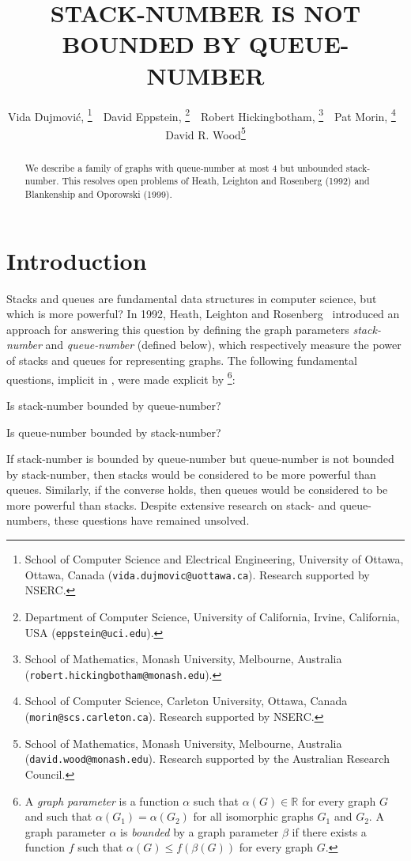\documentclass[kpfonts]{patmorin}
\title{\MakeUppercase{Stack-Number is not Bounded by Queue-Number}}
\author{%
	Vida Dujmovi\'c,\!\!%
	\thanks{School of Computer Science and Electrical Engineering,
		University of Ottawa, Ottawa, Canada (\texttt{vida.dujmovic@uottawa.ca}).
		Research supported by NSERC.}
	\,\,
	David Eppstein,\!\!%
	\thanks{Department of Computer Science, University of California, Irvine, California, USA (\texttt{eppstein@uci.edu}).}
	\,\,
	Robert Hickingbotham,\!\!%
	\thanks{School of Mathematics, Monash University, Melbourne, Australia (\texttt{robert.hickingbotham@monash.edu}).}
	\,\,
	Pat Morin,\!\!%
	\thanks{School of Computer Science, Carleton University, Ottawa, Canada (\texttt{morin@scs.carleton.ca}). Research  supported by NSERC.}
	\,\,
	David R. Wood\thanks{School of Mathematics, Monash University, Melbourne, Australia (\texttt{david.wood@monash.edu}). Research supported by the Australian Research Council.}
}
\renewcommand{\leq}{\leqslant}
\begin{document}
\maketitle

\begin{abstract}
We describe a family of graphs with queue-number at most 4 but unbounded stack-number. This resolves open problems of Heath, Leighton and Rosenberg (1992) and Blankenship and Oporowski (1999).
\end{abstract}

\bigskip

\section{Introduction}

Stacks and queues are fundamental data structures in computer science, but which is more powerful? In 1992, Heath, Leighton and Rosenberg~\cite{HLR92,HR92} introduced an approach for answering this question by defining the graph parameters \textit{stack-number} and \textit{queue-number} (defined below), which respectively measure the power of stacks and queues for representing graphs. The following fundamental questions, implicit in \citep{HLR92,HR92}, were made explicit by \citet{DujWoo05}\footnote{A \emph{graph parameter} is a function $\alpha$ such that $\alpha(G)\in\mathbb{R}$ for every graph $G$ and such that $\alpha(G_1)=\alpha(G_2)$ for all isomorphic graphs $G_1$ and $G_2$. A graph parameter $\alpha$ is \textit{bounded} by a graph parameter $\beta$ if there exists a function $f$ such that $\alpha(G) \leq f(\beta(G))$ for every graph $G$.}:
\begin{compactitem}
	\item Is stack-number bounded by queue-number?
	\item Is queue-number bounded by stack-number?
\end{compactitem}

If stack-number is bounded by queue-number but queue-number is not bounded by stack-number, then stacks would be considered to be more powerful than queues. Similarly, if the converse holds, then queues would be considered to be more powerful than stacks. Despite extensive research on stack- and queue-numbers, these questions have remained unsolved.
\end{document}
